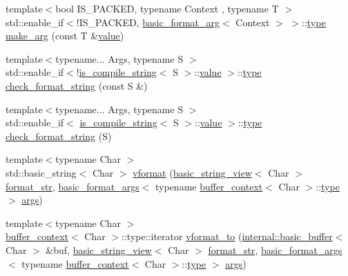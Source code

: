 \begin{DoxyCompactItemize}
{\footnotesize template$<$bool I\+S\+\_\+\+P\+A\+C\+K\+ED, typename Context , typename T $>$ }\\std\+::enable\+\_\+if$<$!I\+S\+\_\+\+P\+A\+C\+K\+ED, \hyperlink{classbasic__format__arg}{basic\+\_\+format\+\_\+arg}$<$ Context $>$ $>$\+::\hyperlink{namespaceinternal_a8661864098ac0acff9a6dd7e66f59038}{type} \hyperlink{namespaceinternal_a588cd6ff21216b089465cc97c74e0df5}{make\+\_\+arg} (const T \&\hyperlink{classinternal_1_1value}{value})
\item 
{\footnotesize template$<$typename... Args, typename S $>$ }\\std\+::enable\+\_\+if$<$!\hyperlink{structis__compile__string}{is\+\_\+compile\+\_\+string}$<$ S $>$\+::\hyperlink{classinternal_1_1value}{value} $>$\+::\hyperlink{namespaceinternal_a8661864098ac0acff9a6dd7e66f59038}{type} \hyperlink{namespaceinternal_a14d62818b14fe8556fdb1718e12fd1ab}{check\+\_\+format\+\_\+string} (const S \&)
\item 
{\footnotesize template$<$typename... Args, typename S $>$ }\\std\+::enable\+\_\+if$<$ \hyperlink{structis__compile__string}{is\+\_\+compile\+\_\+string}$<$ S $>$\+::\hyperlink{classinternal_1_1value}{value} $>$\+::\hyperlink{namespaceinternal_a8661864098ac0acff9a6dd7e66f59038}{type} \hyperlink{namespaceinternal_a6184fcc754b94046ef76495b8b105024}{check\+\_\+format\+\_\+string} (S)
\item 
{\footnotesize template$<$typename Char $>$ }\\std\+::basic\+\_\+string$<$ Char $>$ \hyperlink{namespaceinternal_a581988072e193a0fb0f54827f1b42cfd}{vformat} (\hyperlink{classbasic__string__view}{basic\+\_\+string\+\_\+view}$<$ Char $>$ \hyperlink{format_8h_aa2b402011ee0619f2158f13e0827e585}{format\+\_\+str}, \hyperlink{classbasic__format__args}{basic\+\_\+format\+\_\+args}$<$ typename \hyperlink{structbuffer__context}{buffer\+\_\+context}$<$ Char $>$\+::\hyperlink{namespaceinternal_a8661864098ac0acff9a6dd7e66f59038}{type} $>$ \hyperlink{printf_8h_a47047b7b28fd1342eef756b79c778580}{args})
\item 
{\footnotesize template$<$typename Char $>$ }\\\hyperlink{structbuffer__context}{buffer\+\_\+context}$<$ Char $>$\+::type\+::iterator \hyperlink{namespaceinternal_a9f6f592ec8a979251038265f241e7d48}{vformat\+\_\+to} (\hyperlink{classinternal_1_1basic__buffer}{internal\+::basic\+\_\+buffer}$<$ Char $>$ \&buf, \hyperlink{classbasic__string__view}{basic\+\_\+string\+\_\+view}$<$ Char $>$ \hyperlink{format_8h_aa2b402011ee0619f2158f13e0827e585}{format\+\_\+str}, \hyperlink{classbasic__format__args}{basic\+\_\+format\+\_\+args}$<$ typename \hyperlink{structbuffer__context}{buffer\+\_\+context}$<$ Char $>$\+::\hyperlink{namespaceinternal_a8661864098ac0acff9a6dd7e66f59038}{type} $>$ \hyperlink{printf_8h_a47047b7b28fd1342eef756b79c778580}{args})

\end{DoxyCompactItemize}
